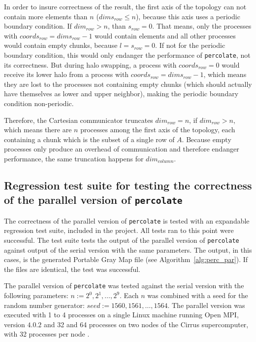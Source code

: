 \documentclass[twoside,11pt]{article}
\def\perc{\texttt{perco\-late}}
\begin{document}
In order to insure correctness of the result, the first
axis of the topology can not contain more elements than $n$
($dims_{row} \leq n$), because this axis uses a periodic
boundary condition.
If $dim_{row} > n$, than $s_{row} = 0$. That means, only
the processes with $coords_{row} = dims_{row} - 1$ would
contain elements and all other processes would contain
empty chunks, because $l = s_{row} = 0$.
If not for the periodic boundary condition, this would only
endanger the performance of \perc{}, not its correctness.
But during halo swapping, a process with $coords_{row} = 0$
would receive its lower halo from a process with
$coords_{row} = dims_{row} - 1$, which means they are
lost to the processes not containing empty chunks
(which should actually have themselves as lower and upper
neighbor), making the periodic boundary condition
non-periodic.

Therefore, the Cartesian communicator truncates
$dim_{row} = n$, if $dim_{row} > n$, which means there are
$n$ processes among the first axis of the topology, each
containing a chunk which is the subset of a single row of
$A$.
Because empty processes only produce an overhead of
communication and therefore endanger performance, the same
truncation happens for $dim_{column}$.



\subsection{Regression test suite for testing the
  correctness of the parallel version of \perc{}}

The correctness of the parallel version of \perc{} is
tested with an expandable regression test suite, included
in the project.
All tests ran to this point were successful.
The test suite tests the output of the parallel version of
\perc{} against output of the serial version with the same
parameters.
The output, in this cases, is the generated Portable Gray
Map file (see Algorithm~\ref{alg:perc_par}).
If the files are identical, the test was successful.

The parallel version of \perc{} was tested against the
serial version with the following parameters:
$n := 2^0, 2^1,\dots,2^9$.
Each $n$ was combined with a seed for the random number
generator: $seed := 1560, 1561,\dots, 1564$.
The parallel version was executed with 1 to 4 processes on
a single Linux machine running Open MPI, version $4.0.2$
and 32 and 64 processes on two nodes of the Cirrus
supercomputer, with 32 processes per node \citep[see][]
{openmpi, cirrus}.
\end{document}
